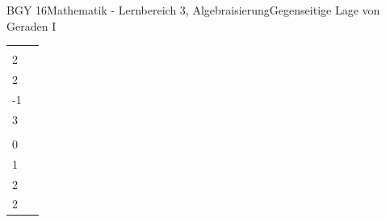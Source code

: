 \documentclass[oneside,openany,headings=optiontotoc,11pt,numbers=noenddot]{scrreprt}
\begin{document}
\begin{worksheet}{BGY 16}{Mathematik - Lernbereich 3, Algebraisierung}{Gegenseitige Lage von Geraden I}
\begin{framed}
\begin{center}
\begin{tabularx}{\textwidth}{X|X}
					\(g_1: \vec{x} = \left(\begin{array}{c}3\\2\end{array}\right) + r\left(\begin{array}{c}4\\2\end{array}\right)\) & 
					\(g_2: \vec{x} = \left(\begin{array}{c}2\\-1\end{array}\right) + r\left(\begin{array}{c}-6\\3\end{array}\right)\)\\
					\(h_1: \vec{x} = \left(\begin{array}{c}1\\0\end{array}\right) + t\left(\begin{array}{c}2\\1\end{array}\right)\) & \(h_2: \vec{x} = \left(\begin{array}{c}3\\2\end{array}\right) + t\left(\begin{array}{c}1\\2\end{array}\right)\)\\
				\end{tabularx}
			\end{center}
			

\end{framed}
\end{worksheet}
\end{document}
